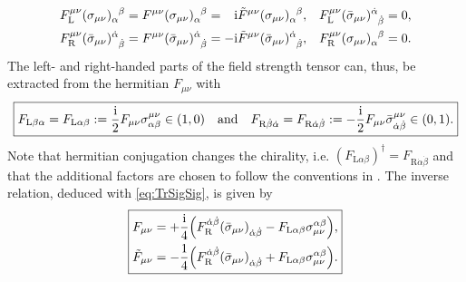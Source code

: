 \begin{equation}
	\begin{alignedat}{6}
		& F_{\mathrm{L}}^{\mu \nu} \tensor{(\sigma_{\mu \nu})}{_{\alpha}^{\beta}}
		&&= F^{\mu \nu} \tensor{(\sigma_{\mu \nu})}{_{\alpha}^{\beta}}
		&&= \quad &&\mi &&\tilde{F}^{\mu \nu} \tensor{(\sigma_{\mu \nu})}{_{\alpha}^{\beta}}, \quad
		&&F_{\mathrm{L}}^{\mu \nu} \tensor{(\bar{\sigma}_{\mu \nu})}{^{\dot{\alpha}} _{\dot{\beta}}} = 0
		\text{,} \\
%		
		& F_{\mathrm{R}}^{\mu \nu} \tensor{(\bar{\sigma}_{\mu \nu})}{^{\dot{\alpha}} _{\dot{\beta}}}
		&&= F^{\mu \nu} \tensor{(\bar{\sigma}_{\mu \nu})}{^{\dot{\alpha}} _{\dot{\beta}}}
		&&= -&&\mi &&\tilde{F}^{\mu \nu} \tensor{(\bar{\sigma}_{\mu \nu})}{^{\dot{\alpha}} _{\dot{\beta}}}, \quad
		&&F_{\mathrm{R}}^{\mu \nu} \tensor{(\sigma_{\mu \nu})}{_{\alpha}^{\beta}} = 0
		\text{.}
	\end{alignedat}
\end{equation}
The left- and right-handed parts of the field strength tensor can, thus, be extracted from the hermitian $ F_{\mu \nu} $  with
\begin{equation}
	\boxed{
		\begin{aligned}
			F_{\mathrm{L} \beta \alpha} = F_{\mathrm{L} \alpha \beta} &:= \frac{\mathrm{i}}{2} F_{\mu \nu} \sigma_{\alpha \beta}^{\mu \nu} \in (1,0)
			\quad \text{and} \quad
			F_{\mathrm{R} \dot{\beta} \dot{\alpha}} = F_{\mathrm{R} \dot{\alpha} \dot{\beta}} := -\frac{\mathrm{i}}{2} F_{\mu \nu} \bar{\sigma}_{\dot{\alpha} \dot{\beta}}^{\mu \nu} \in (0,1)
			\text{.} \\
		\end{aligned}
		\label{eq:fieldStrengthTensorsApp}
	}
\end{equation}
Note that hermitian conjugation changes the chirality, i.e. $ (F_{\mathrm{L} \alpha \beta})^{\dagger} = F_{\mathrm{R} \dot{\alpha} \dot{\beta}} $ and that the additional factors are chosen to follow the conventions in .
The inverse relation, deduced with \cref{eq:TrSigSig}, is given by
\begin{equation}
	\boxed{
		\begin{aligned}
			F_{\mu \nu} &= + \frac{\mi}{4} \Big(F_{\mathrm{R}}^{\dot{\alpha} \dot{\beta}} \tensor{(\bar{\sigma}_{\mu \nu})}{_{\dot{\alpha} \dot{\beta}}} - F_{\mathrm{L} \alpha \beta} \sigma_{\mu \nu}^{\alpha \beta}\Big) ,\\
			\tilde{F}_{\mu \nu} &= -\frac{1}{4} \Big(F_{\mathrm{R}}^{\dot{\alpha} \dot{\beta}} \tensor{(\bar{\sigma}_{\mu \nu})}{_{\dot{\alpha} \dot{\beta}}} + F_{\mathrm{L} \alpha \beta} \sigma_{\mu \nu}^{\alpha \beta}\Big)
			\text{.}
		\end{aligned}
	}
\end{equation}
